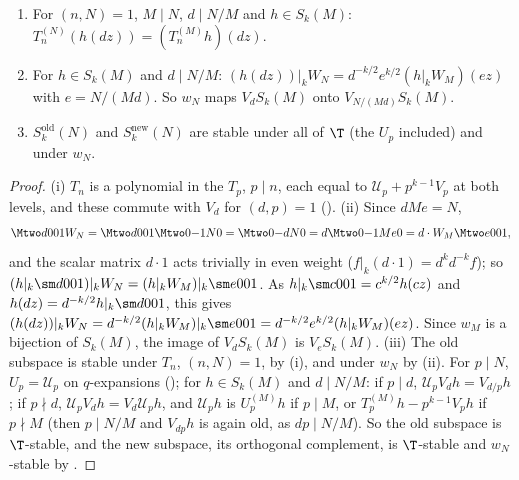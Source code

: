 \begin{proposition}\label{prop:hecke:old-new}
\begin{enumerate}[label=(\roman*)]
\item For $(n,N)=1$, $M\mid N$, $d\mid N/M$ and $h\in S_k(M)$: $T_n^{(N)}(h(dz))=(T_n^{(M)}h)(dz)$.
\item For $h\in S_k(M)$ and $d\mid N/M$: $(h(dz))|_kW_N=d^{-k/2}e^{k/2}(h|_kW_M)(ez)$ with $e=N/(Md)$. So $w_N$ maps $V_dS_k(M)$ onto $V_{N/(Md)}S_k(M)$.
\item $S_k^{\mathrm{old}}(N)$ and $S_k^{\mathrm{new}}(N)$ are stable under all of $\T$ (the $U_p$ included) and under $w_N$.
\end{enumerate}
\end{proposition}

\begin{proof}
(i) $T_n$ is a polynomial in the $T_p$, $p\mid n$, each equal to $\mathcal U_p+p^{k-1}V_p$ at both levels, and these commute with $V_d$ for $(d,p)=1$ (). (ii) Since $dMe=N$,
\[
\Mtwo d001W_N=\Mtwo d001\Mtwo0{-1}N0=\Mtwo0{-d}N0=d\Mtwo0{-1}{Me}0=d\cdot W_M\Mtwo e001,
\]
and the scalar matrix $d\cdot1$ acts trivially in even weight ($f|_k(d\cdot1)=d^kd^{-k}f$); so $(h|_k\sm d001)|_kW_N=(h|_kW_M)|_k\sm e001$. As $h|_k\sm c001=c^{k/2}h(cz)$ and
$h(dz)=d^{-k/2}h|_k\sm d001$, this gives $(h(dz))|_kW_N=d^{-k/2}(h|_kW_M)|_k\sm e001=d^{-k/2}e^{k/2}(h|_kW_M)(ez)$. Since $w_M$
is a bijection of $S_k(M)$, the image of $V_dS_k(M)$ is $V_eS_k(M)$. (iii) The old subspace is stable under $T_n$, $(n,N)=1$, by (i), and under $w_N$ by (ii). For $p\mid N$, $U_p=\mathcal U_p$ on
$q$-expansions (); for $h\in S_k(M)$ and $d\mid N/M$: if $p\mid d$, $\mathcal U_pV_dh=V_{d/p}h$; if $p\nmid d$, $\mathcal U_pV_dh=V_d\mathcal U_ph$, and $\mathcal U_ph$ is $U_p^{(M)}h$ if $p\mid M$, or
$T_p^{(M)}h-p^{k-1}V_ph$ if $p\nmid M$ (then $p\mid N/M$ and $V_{dp}h$ is again old, as $dp\mid N/M$). So the old subspace is $\T$-stable, and the new subspace, its orthogonal complement, is
$\T$-stable and $w_N$-stable by .
\end{proof}

